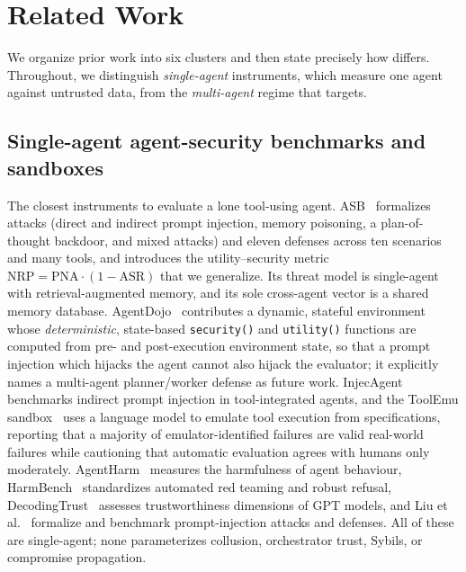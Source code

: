 \section{Related Work}
\label{sec:related}

We organize prior work into six clusters and then state precisely how 
differs. Throughout, we distinguish \emph{single-agent} instruments, which measure one
agent against untrusted data, from the \emph{multi-agent} regime that  targets.

\subsection{Single-agent agent-security benchmarks and sandboxes}
The closest instruments to  evaluate a lone tool-using agent. ASB~\cite{zhang2025asb}
formalizes attacks (direct and indirect prompt injection, memory poisoning, a
plan-of-thought backdoor, and mixed attacks) and eleven defenses across ten scenarios
and many tools, and introduces the utility--security metric $\mathrm{NRP}=\mathrm{PNA}\cdot(1-\mathrm{ASR})$
that we generalize. Its threat model is single-agent with retrieval-augmented memory,
and its sole cross-agent vector is a shared memory database. AgentDojo~\cite{debenedetti2024agentdojo}
contributes a dynamic, stateful environment whose \emph{deterministic}, state-based
\texttt{security()} and \texttt{utility()} functions are computed from pre- and
post-execution environment state, so that a prompt injection which hijacks the agent
cannot also hijack the evaluator; it explicitly names a multi-agent planner/worker
defense as future work. InjecAgent~\cite{zhan2024injecagent} benchmarks indirect prompt
injection in tool-integrated agents, and the ToolEmu sandbox~\cite{ruan2024toolemu}
uses a language model to emulate tool execution from specifications, reporting that a
majority of emulator-identified failures are valid real-world failures while cautioning
that automatic evaluation agrees with humans only moderately. AgentHarm~\cite{andriushchenko2025agentharm}
measures the harmfulness of agent behaviour, HarmBench~\cite{mazeika2024harmbench}
standardizes automated red teaming and robust refusal, DecodingTrust~\cite{wang2023decodingtrust}
assesses trustworthiness dimensions of GPT models, and Liu et al.~\cite{liu2024formalizing}
formalize and benchmark prompt-injection attacks and defenses. All of these are
single-agent; none parameterizes collusion, orchestrator trust, Sybils, or
compromise propagation.

